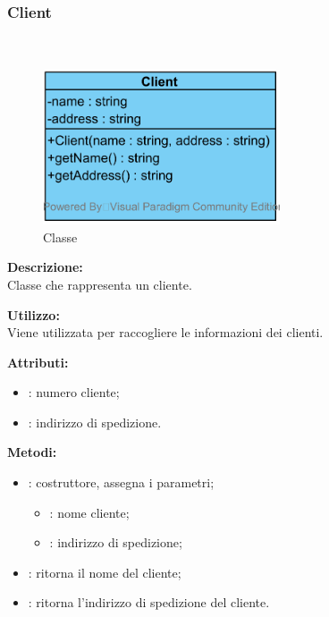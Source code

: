 \subsubsection{Client}
\paragraph[::Client]{\class}\mbox{}\\ \label{\class}
\begin{figure}[H]
	\centering
	\includegraphics[width=7cm]{./diagrammi/demo/client/customer/client.png}
	\caption{Classe \class}
\end{figure}
\textbf{Descrizione:}\\
Classe che rappresenta un cliente.

\textbf{Utilizzo:}\\
Viene utilizzata per raccogliere le informazioni dei clienti.

%

\textbf{Attributi:}
\begin{itemize}
	\item {}: numero cliente;
	\item {}: indirizzo di spedizione.
\end{itemize}

\textbf{Metodi:}
\begin{itemize}
	\item {}: costruttore, assegna i parametri;
	\begin{itemize}
		\item {}: nome cliente;
		\item {}: indirizzo di spedizione;
	\end{itemize}
	\item {}: ritorna il nome del cliente;
	\item {}: ritorna l'indirizzo di spedizione del cliente.
\end{itemize}

